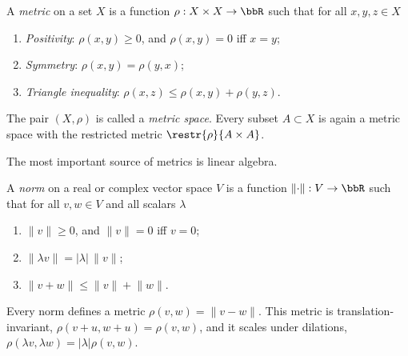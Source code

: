 \begin{defn}
    A \emph{metric} on a set $X$ is a function $\rho:X\times X\to\bbR$ such that for all $x,y,z\in X$
    \begin{enumerate}
        \item \emph{Positivity}: $\rho(x,y)\geq 0$, and $\rho(x,y)=0$ iff $x=y$;
        \item \emph{Symmetry}: $\rho(x,y)=\rho(y,x)$;
        \item \emph{Triangle inequality}: $\rho(x,z)\leq \rho(x,y)+\rho(y,z)$.
    \end{enumerate}
    The pair $(X,\rho)$ is called a \emph{metric space}. Every subset $A\subset X$ is again a metric space with the restricted metric $\restr{\rho}{A\times A}$.
\end{defn}

The most important source of metrics is linear algebra.

\begin{defn}
    A \emph{norm} on a real or complex vector space $V$ is a function $\lVert \cdot \rVert: V\to \bbR$ such that for all $v,w\in V$ and all scalars $\lambda$
    \begin{enumerate}
        \item $\lVert v\rVert\geq 0$, and $\lVert v\rVert= 0$ iff $v=0$;
        \item $\lVert \lambda v\rVert=\lvert \lambda \rvert\, \lVert v\rVert$;
        \item $\lVert v+w\rVert\leq \lVert v\rVert+\lVert w\rVert$.
    \end{enumerate}
    Every norm defines a metric $\rho (v,w)=\lVert v-w\rVert$. This metric is translation-invariant, $\rho(v+u,w+u)=\rho(v,w)$, and it scales under dilations, $\rho(\lambda v,\lambda w)=\lvert\lambda\rvert\rho(v,w)$.
\end{defn}

